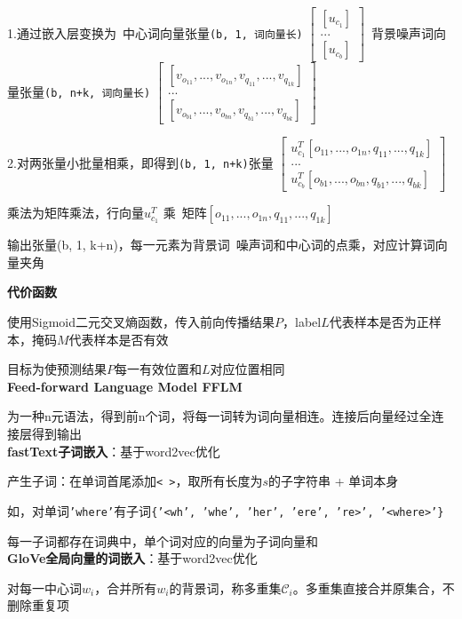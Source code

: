 \documentclass[UTF8]{ctexart}
\begin{document}
  \quad 1.通过嵌入层变换为\ 中心词向量张量\texttt{(b, 1, 词向量长)}
  $\begin{bmatrix}
    [u_{c_1}] \\
    ... \\
    [u_{c_b}]
    \end{bmatrix}
  $\ 背景噪声词向量张量\texttt{(b, n+k, 词向量长)}
  $\begin{bmatrix}
    [v_{o_{11}}, ..., v_{o_{1n}}, v_{q_{11}}, ..., v_{q_{1k}}] \\
    ... \\
    [v_{o_{b1}}, ..., v_{o_{bn}}, v_{q_{b1}}, ..., v_{q_{bk}}]
    \end{bmatrix}
  $

  \quad 2.对两张量小批量相乘，即得到\texttt{(b, 1, n+k)}张量
  $\begin{bmatrix}
    u_{c_1}^T [o_{11}, ..., o_{1n}, q_{11}, ..., q_{1k}] \\
    ... \\
    u_{c_b}^T [o_{b1}, ..., o_{bn}, q_{b1}, ..., q_{bk}]
    \end{bmatrix}
  $

  \quad 乘法为矩阵乘法，行向量$u_{c_1}^T$ 乘\ 矩阵$[o_{11}, ..., o_{1n}, q_{11}, ..., q_{1k}]$
  
  \quad 输出张量(b, 1, k+n)，每一元素为背景词\ 噪声词和中心词的点乘，对应计算词向量夹角
  
  \textbf{代价函数}

  \quad 使用Sigmoid二元交叉熵函数，传入前向传播结果$P$，label$L$代表样本是否为正样本，掩码$M$代表样本是否有效

  \quad 目标为使预测结果$P$每一有效位置和$L$对应位置相同\\
\textbf{Feed-forward Language Model FFLM}

  为一种n元语法，得到前n个词，将每一词转为词向量相连。连接后向量经过全连接层得到输出\\
\textbf{fastText子词嵌入}：基于word2vec优化

  产生子词：在单词首尾添加\texttt{< >}，取所有长度为$s$的子字符串 + 单词本身

  \quad 如，对单词\texttt{'where'}有子词\texttt{\{'<wh', 'whe', 'her', 'ere', 're>', '<where>'\}}

  每一子词都存在词典中，单个词对应的向量为子词向量和\\
\textbf{GloVe全局向量的词嵌入}：基于word2vec优化

  对每一中心词$w_i$，合并所有$w_i$的背景词，称多重集$\mathcal{C}_i$。多重集直接合并原集合，不删除重复项
\end{document}
